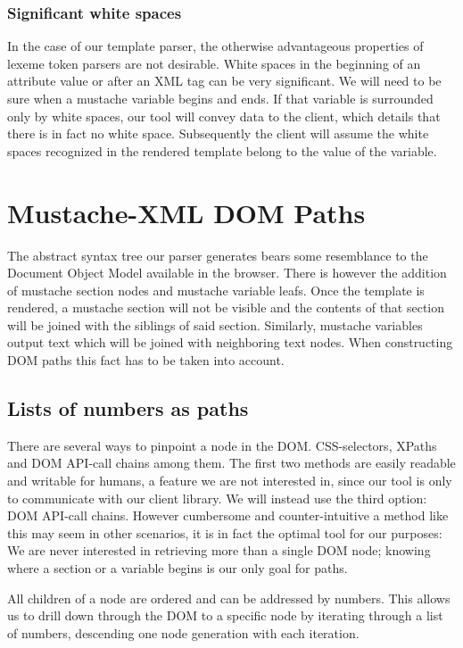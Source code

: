\subsubsection{Significant white spaces}
In the case of our template parser, the otherwise advantageous properties
of lexeme token parsers are not desirable.
White spaces in the beginning of an attribute value or after an XML tag can be
very significant.
We will need to be sure when a mustache variable begins and ends.
If that variable is surrounded only by white spaces, our tool will convey
data to the client, which details that there is in fact no white space.
Subsequently the client will assume the white spaces recognized in the
rendered template belong to the value of the variable.

\section{Mustache-XML DOM Paths}
The abstract syntax tree our parser generates bears some resemblance to the
Document Object Model available in the browser. There is however the addition of
mustache section nodes and mustache variable leafs.
Once the template is rendered, a mustache section will not be visible and the
contents of that section will be joined with the siblings of said section.
Similarly, mustache variables output text which will be joined with neighboring
text nodes. When constructing DOM paths this fact has to be taken into account.

\subsection{Lists of numbers as paths}
There are several ways to pinpoint a node in the DOM. CSS-selectors, XPaths and
DOM API-call chains among them. The first two methods are easily
readable and writable for humans, a feature we are not interested in, since our
tool is only to communicate with our client library.
We will instead use the third option: DOM API-call chains. However cumbersome
and counter-intuitive a method like this may seem in other scenarios, it is
in fact the optimal tool for our purposes: We are never interested in retrieving
more than a single DOM node; knowing where a section or a variable begins is our
only goal for paths.

All children of a node are ordered and can be addressed by numbers. This allows
us to drill down through the DOM to a specific node by iterating through a list
of numbers, descending one node generation with each iteration.


